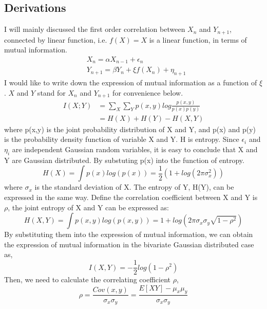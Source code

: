 \documentclass{article}
\begin{document}
		\subsection{Derivations}
		I will mainly discussed the first order correlation between $X_n$ and $Y_{n+1}$, connected by linear function, i.e. $f(X) = X$ is a linear function, in terms of mutual information.
		\begin{equation}
			\begin{aligned}
				&X_n = \alpha X_{n-1} + \epsilon_n \\
				&Y_{n+1} = \beta Y_{n} + \xi f(X_n) + \eta_{n+1}
			\end{aligned}
		\end{equation}
		I would like to write down the expression of mutual information as a function of $\xi$. $X$ and $Y$ stand for $X_n$ and $Y_{n+1}$ for convenience below.
		\begin{equation}
			\begin{aligned}
				I(X;Y) & = \sum_X\sum_Yp(x,y)log\frac{p(x,y)}{p(x)p(y)} \\
				& = H(X) + H(Y) - H(X,Y)
			\end{aligned}
		\end{equation}
		where p(x,y) is the joint probability distribution of X and Y, and p(x) and p(y) is the probability density function of variable X and Y. H is entropy. Since $\epsilon_i$ and $\eta_i$ are independent Gaussian random variables, it is easy to conclude that X and Y are Gaussian distributed. By substuting p(x) into the function of entropy.
		\begin{equation}
			H(X) = \int p(x)log(p(x)) = \frac{1}{2}(1+log(2\pi\sigma_x^2))
		\end{equation}
		where $\sigma_x$ is the standard deviation of X. The entropy of Y, H(Y), can be expressed in the same way. Define the correlation coefficient between X and Y is $\rho$, the joint entropy of X and Y can be expressed as:
		\begin{equation}
			H(X,Y) = \int p(x,y)log(p(x,y)) = 1+log(2\pi\sigma_x\sigma_y\sqrt{1-\rho^2})
		\end{equation}
		By substituting them into the expression of mutual information, we can obtain the expression of mutual information in the bivariate Gaussian distributed case as,
		\begin{equation}
			I(X,Y) = -\frac{1}{2}log(1-\rho^2)
		\end{equation}
		Then, we need to calculate the correlating coefficient $\rho$,
		\begin{equation}
			\rho = \frac{Cov(x,y)}{\sigma_x\sigma_y} = \frac{E[XY] - \mu_x\mu_y}{\sigma_x\sigma_y}
		\end{equation}
\end{document}
